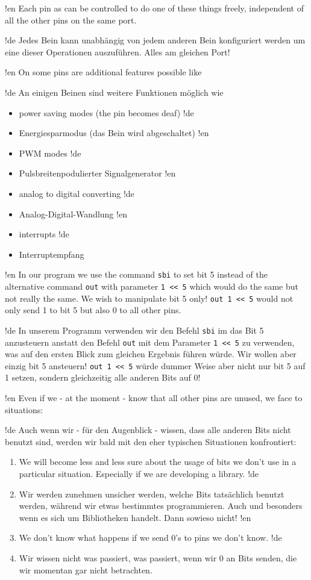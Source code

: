 !en Each pin as can be controlled to do one of these things freely, independent of all the other pins on the same port.

!de Jedes Bein kann unabhängig von jedem anderen Bein konfiguriert werden um eine dieser Operationen auszuführen. Alles am gleichen Port!



!en On some pins are additional features possible like

!de An einigen Beinen sind weitere Funktionen möglich wie

\begin{itemize}
!en   \item power saving modes (the pin becomes deaf)
!de   \item Energiesparmodus (das Bein wird abgeschaltet)
!en   \item PWM modes
!de   \item Pulsbreitenpodulierter Signalgenerator
!en   \item analog to digital converting
!de   \item Analog-Digital-Wandlung
!en   \item interrupts
!de   \item Interruptempfang
\end{itemize}

!en In our program we use the command \texttt{sbi} to set bit 5 instead of the alternative command \texttt{out} with parameter \texttt{1 << 5} which would do the same but not really the same. We wish to manipulate bit 5 only! \texttt{out 1 << 5} would not only send 1 to bit 5 but also 0 to all other pins.

!de In unserem Programm verwenden wir den Befehl \texttt{sbi} im das Bit 5 anzusteuern anstatt den Befehl \texttt{out} mit dem Parameter \texttt{1 << 5} zu verwenden, was auf den ersten Blick zum gleichen Ergebnis führen würde. Wir wollen aber einzig bit 5 ansteuern! \texttt{out 1 << 5} würde dummer Weise aber nicht nur bit 5 auf 1 setzen, sondern gleichzeitig alle anderen Bits auf 0!


!en Even if we - at the moment - know that all other pins are unused, we face to situations:

!de Auch wenn wir - für den Augenblick - wissen, dass alle anderen Bits nicht benutzt sind, werden wir bald mit den eher typischen Situationen konfrontiert:

\begin{enumerate}
!en   \item We will become less and less sure about the usage of bits we don't use in a particular situation. Especially if we are developing a library.
!de   \item Wir werden zunehmen unsicher werden, welche Bits tatsächlich benutzt werden, während wir etwas bestimmtes programmieren. Auch und besonders wenn es sich um Bibliotheken handelt. Dann sowieso nicht!
!en   \item We don't know what happens if we send 0's to pins we don't know.
!de   \item Wir wissen nicht was passiert, was passiert, wenn wir 0 an Bits senden, die wir momentan gar nicht betrachten.
\end{enumerate}



